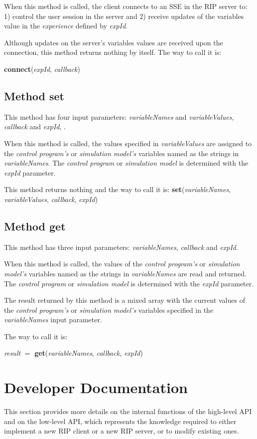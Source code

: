 When this method is called, the client connects to an SSE in the RIP server to: 1) control the user session in the server and 2) receive updates of the variables value in the \textit{experience} defined by \textit{expId}.

Although updates on the server's variables values are received upon the connection, this method returns nothing by itself. The way to call it is: 

\textbf{connect}(\textit{expId}, \textit{callback})

\subsection{Method set}
This method has four input parameters: \textit{variableNames} and \textit{variableValues}, \textit{callback} and \textit{expId}, .

When this method is called, the values specified in \textit{variableValues} are assigned to the \textit{control program's} or \textit{simulation model's} variables named as the strings in \textit{variableNames}. The \textit{control program} or \textit{simulation model} is determined with the \textit{expId} parameter. 

This method returns nothing and the way to call it is: \textbf{set}(\textit{variableNames}, \textit{variableValues}, \textit{callback}, \textit{expId})

\subsection{Method get}
This method has three input parameters: \textit{variableNames}, \textit{callback} and \textit{expId}.

When this method is called, the values of the \textit{control program's} or \textit{simulation model's} variables named as the strings in \textit{variableNames} are read and returned. The \textit{control program} or \textit{simulation model} is determined with the \textit{expId} parameter.

The result returned by this method is a mixed array with the current values of the \textit{control program's} or \textit{simulation model's} variables specified in the \textit{variableNames} input parameter.

The way to call it is:

\textit{result} $=$ \textbf{get}(\textit{variableNames}, \textit{callback}, \textit{expId})

\section{Developer Documentation}
\label{sec:Developer_Doc}
This section provides more details on the internal functions of the high-level API and on the low-level API, which represents the knowledge required to either implement a new RIP client or a new RIP server, or to modify existing ones.


